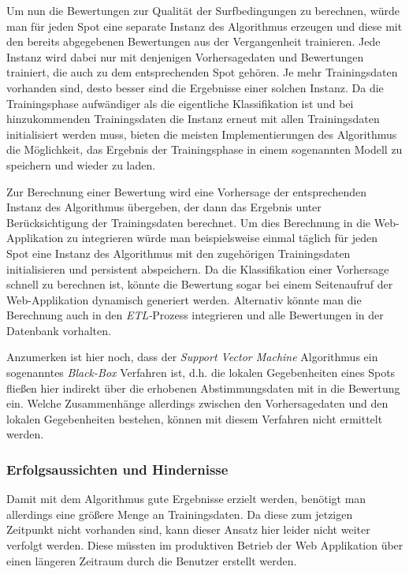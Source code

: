Um nun die Bewertungen zur Qualität der Surfbedingungen zu berechnen,
würde man für jeden Spot eine separate Instanz des Algorithmus
erzeugen und diese mit den bereits abgegebenen Bewertungen aus der
Vergangenheit trainieren. Jede Instanz wird dabei nur mit denjenigen
Vorhersagedaten und Bewertungen trainiert, die auch zu dem
entsprechenden Spot gehören. Je mehr Trainingsdaten vorhanden sind,
desto besser sind die Ergebnisse einer solchen Instanz. Da die
Trainingsphase aufwändiger als die eigentliche Klassifikation ist und
bei hinzukommenden Trainingsdaten die Instanz erneut mit allen
Trainingsdaten initialisiert werden muss, bieten die meisten
Implementierungen des Algorithmus die Möglichkeit, das Ergebnis der
Trainingsphase in einem sogenannten Modell zu speichern und wieder zu
laden.

Zur Berechnung einer Bewertung wird eine Vorhersage der entsprechenden
Instanz des Algorithmus übergeben, der dann das Ergebnis unter
Berücksichtigung der Trainingsdaten berechnet. Um dies Berechnung in
die Web-Applikation zu integrieren würde man beispielsweise einmal
täglich für jeden Spot eine Instanz des Algorithmus mit den
zugehörigen Trainingsdaten initialisieren und persistent
abspeichern. Da die Klassifikation einer Vorhersage schnell zu
berechnen ist, könnte die Bewertung sogar bei einem Seitenaufruf der
Web-Applikation dynamisch generiert werden. Alternativ könnte man die
Berechnung auch in den \textit{ETL-}Prozess integrieren und alle
Bewertungen in der Datenbank vorhalten.

Anzumerken ist hier noch, dass der \textit{Support Vector Machine}
Algorithmus ein sogenanntes \textit{Black-Box} Verfahren ist, d.h. die
lokalen Gegebenheiten eines Spots fließen hier indirekt über die
erhobenen Abstimmungsdaten mit in die Bewertung ein. Welche
Zusammenhänge allerdings zwischen den Vorhersagedaten und den lokalen
Gegebenheiten bestehen, können mit diesem Verfahren nicht ermittelt
werden.

\subsubsection{Erfolgsaussichten und Hindernisse}
Damit mit dem Algorithmus gute Ergebnisse erzielt werden, benötigt man
allerdings eine größere Menge an Trainingsdaten. Da diese zum jetzigen
Zeitpunkt nicht vorhanden sind, kann dieser Ansatz hier leider nicht
weiter verfolgt werden. Diese müssten im produktiven Betrieb der Web
Applikation über einen längeren Zeitraum durch die Benutzer erstellt
werden.

